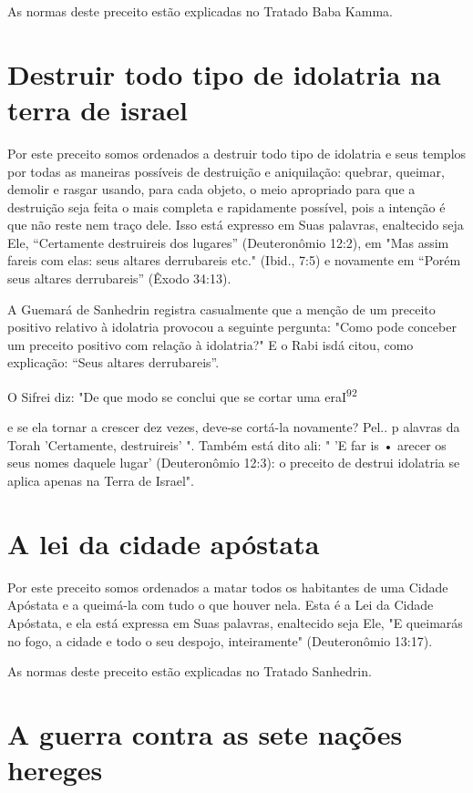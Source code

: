 As normas deste preceito estão explicadas no Tratado Baba Kamma.


\section{Destruir todo tipo de idolatria na terra de israel}

Por este preceito somos ordenados a destruir todo tipo de idolatria e
seus templos por todas as maneiras possíveis de destruição e
aniquilação: que­brar, queimar, demolir e rasgar usando, para cada
objeto, o meio apropriado para que a destruição seja feita o mais
completa e rapidamente possível, pois a intenção é que não reste nem
traço dele. Isso está expresso em Suas palavras, enaltecido seja Ele,
``Certamente destruireis dos lugares'' (Deuteronômio 12:2), em "Mas assim
fareis com elas: seus altares derrubareis etc." (Ibid., 7:5) e
nova­mente em ``Porém seus altares derrubareis'' (Êxodo 34:13).

A Guemará de Sanhedrin registra casualmente que a menção de um preceito
positivo relativo à idolatria provocou a seguinte pergunta: "Como pode
conceber um preceito positivo com relação à idolatria?" E o Rabi isdá
citou, como explicação: ``Seus altares derrubareis''.

O Sifrei diz: "De que modo se conclui que se cortar uma
eraI\textsuperscript{92}

e se ela tornar a crescer dez vezes, deve-se cortá-la novamente? Pel.. p
alavras da Torah 'Certamente, destruireis' ". Também está dito ali: " 'E
far is • arecer os seus nomes daquele lugar' (Deuteronômio 12:3): o
preceito de destrui ido­latria se aplica apenas na Terra de Israel".

\section{A lei da cidade apóstata}

Por este preceito somos ordenados a matar todos os habitantes de uma
Cidade Apóstata e a queimá-la com tudo o que houver nela. Esta é a Lei
da Cidade Apóstata, e ela está expressa em Suas palavras, enaltecido
seja Ele, "E queimarás no fogo, a cidade e todo o seu despojo,
inteiramente" (Deuteronômio 13:17).


As normas deste preceito estão explicadas no Tratado Sanhedrin.


\section{A guerra contra as sete nações hereges}

